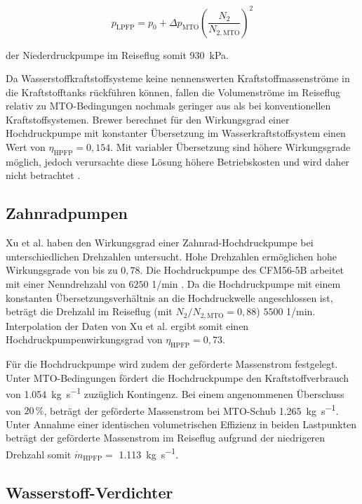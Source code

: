 \begin{equation}\label{Eq:lpfp}
	p_{\mathrm{LPFP}}=p_0+\Delta p_{\mathrm{MTO}}\left(\frac{N_2}{N_{2,\mathrm{MTO}}}\right)^2
\end{equation}

der Niederdruckpumpe im Reiseflug somit \SI{930}{\kilo\Pa}.

Da Wasserstoffkraftstoffsysteme keine nennenswerten Kraftstoffmassenströme in die Kraftstofftanks rückführen können, fallen die Volumenströme im Reiseflug relativ zu MTO-Bedingungen nochmals geringer aus als bei konventionellen Kraftstoffsystemen. Brewer \cite{Brewer.1991} berechnet für den Wirkungsgrad einer Hochdruckpumpe mit konstanter Übersetzung im Wasserkraftstoffsystem einen Wert von $\eta_{\mathrm{HPFP}}=0,154$. Mit variabler Übersetzung sind höhere Wirkungsgrade möglich, jedoch verursachte diese Lösung höhere Betriebskosten und wird daher nicht betrachtet \cite{Brewer.1991}. 

\subsection{Zahnradpumpen}

Xu et al. \cite{Xu.2024} haben den Wirkungsgrad einer Zahnrad-Hochdruckpumpe bei unterschiedlichen Drehzahlen untersucht. Hohe Drehzahlen ermöglichen hohe Wirkungsgrade von bis zu $0,78$. Die Hochdruckpumpe des CFM56-5B arbeitet mit einer Nenndrehzahl von $6250$ 1/min \cite{EatonFuelSystemsDivision.2008}. Da die Hochdruckpumpe mit einem konstanten Übersetzungsverhältnis an die Hochdruckwelle angeschlossen ist, beträgt die Drehzahl im Reiseflug (mit $N_2/N_{2,\mathrm{MTO}}=0,88$) $5500$ 1/min. Interpolation der Daten von Xu et al. \cite{Xu.2024} ergibt somit einen Hochdruckpumpenwirkungsgrad von $\eta_{\mathrm{HPFP}}=0,73$.

Für die Hochdruckpumpe wird zudem der geförderte Massenstrom festgelegt. Unter MTO-Bedingungen fördert die Hochdruckpumpe den Kraftstoffverbrauch von \SI{1.054}{\kg\per\s} zuzüglich Kontingenz. Bei einem angenommenen Überschuss von $20\,\%$, beträgt der geförderte Massenstrom bei MTO-Schub \SI{1.265}{\kg\per\s}. Unter Annahme einer identischen volumetrischen Effizienz in beiden Lastpunkten beträgt der geförderte Massenstrom im Reiseflug aufgrund der niedrigeren Drehzahl somit $\dot{m}_\mathrm{HPFP}=$ \SI{1.113}{\kg\per\s}.

\subsection{Wasserstoff-Verdichter}

